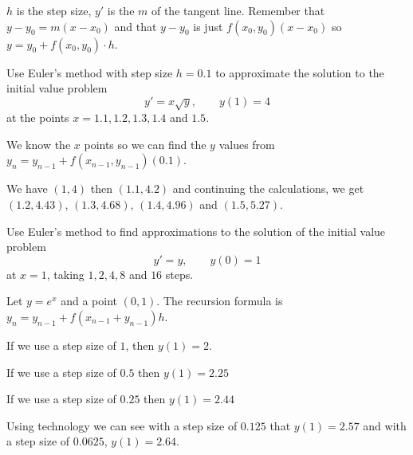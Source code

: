 \documentclass[../diffeq.tex]{subfiles}
\begin{document}
$h$ is the step size, $y'$ is the $m$ of the tangent line. Remember that $y-y_0=m(x-x_0)$ and that $y-y_0$ is just $f(x_0,y_0)(x-x_0)$ so $y=y_0+f(x_0,y_0)\cdot h$.

\begin{example}
    Use Euler's method with step size $h=0.1$ to approximate the solution to the initial value problem 
    \[ y' = x\sqrt{y}, \qquad y(1)=4\]
    at the points $x=1.1,1.2,1.3,1.4$ and $1.5$.

    We know the $x$ points so we can find the $y$ values from $y_n=y_{n-1}+f(x_{n-1},y_{n-1})(0.1)$.

    We have $(1,4)$ then $(1.1,4.2)$ and continuing the calculations, we get $(1.2,4.43)$, $(1.3, 4.68)$, $(1.4, 4.96)$ and $(1.5,5.27)$.    
\end{example}

\begin{example}
    Use Euler's method to find approximations to the solution of the initial value problem 
    \[ y' = y, \qquad y(0)=1\]
    at $x=1$, taking $1,2,4,8$ and $16$ steps.

    Let $y=e^x$ and a point $(0,1)$. The recursion formula is $y_n=y_{n-1}+f(x_{n-1}+y_{n-1})h$.

    If we use a step size of $1$, then $y(1) =2$.

    If we use a step size of $0.5$ then $y(1) = 2.25$

    If we use a step size of $0.25$ then $y(1) = 2.44$

    Using technology we can see with a step size of $0.125$ that $y(1)=2.57$ and with a step size of $0.0625$, $y(1)=2.64$.    
\end{example}
\end{document}
